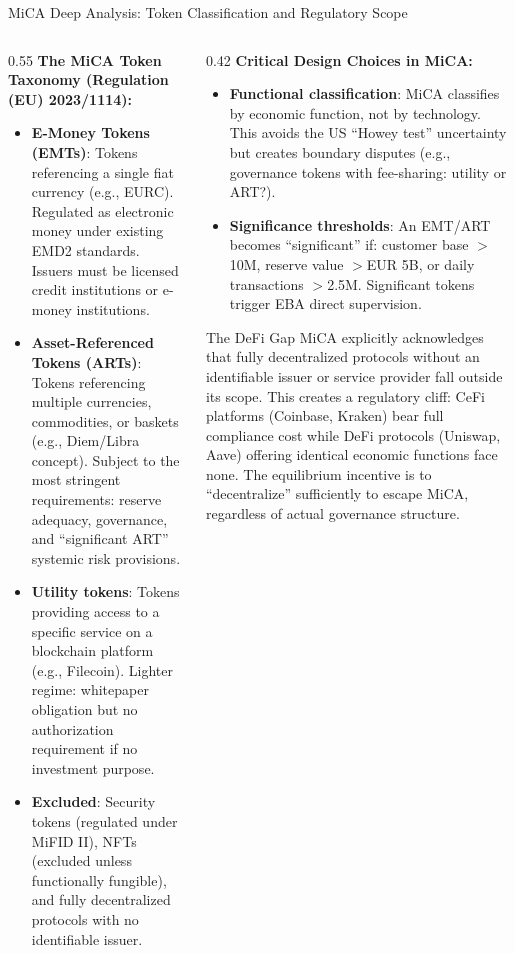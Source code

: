 \begin{frame}{MiCA Deep Analysis: Token Classification and Regulatory Scope}
  \begin{columns}[T]
    \begin{column}{0.55\textwidth}
      \textbf{The MiCA Token Taxonomy (Regulation (EU) 2023/1114):}
      \begin{itemize}
        \item \textbf{E-Money Tokens (EMTs)}: Tokens referencing a single fiat currency (e.g., EURC). Regulated as electronic money under existing EMD2 standards. Issuers must be licensed credit institutions or e-money institutions.
        \item \textbf{Asset-Referenced Tokens (ARTs)}: Tokens referencing multiple currencies, commodities, or baskets (e.g., Diem/Libra concept). Subject to the most stringent requirements: reserve adequacy, governance, and ``significant ART'' systemic risk provisions.
        \item \textbf{Utility tokens}: Tokens providing access to a specific service on a blockchain platform (e.g., Filecoin). Lighter regime: whitepaper obligation but no authorization requirement if no investment purpose.
        \item \textbf{Excluded}: Security tokens (regulated under MiFID II), NFTs (excluded unless functionally fungible), and fully decentralized protocols with no identifiable issuer.
      \end{itemize}
    \end{column}
    \begin{column}{0.42\textwidth}
      \textbf{Critical Design Choices in MiCA:}
      \begin{itemize}
        \item \textbf{Functional classification}: MiCA classifies by economic function, not by technology. This avoids the US ``Howey test'' uncertainty but creates boundary disputes (e.g., governance tokens with fee-sharing: utility or ART?).
        \item \textbf{Significance thresholds}: An EMT/ART becomes ``significant'' if: customer base $>$10M, reserve value $>$EUR 5B, or daily transactions $>$2.5M. Significant tokens trigger EBA direct supervision.
      \end{itemize}
      \vspace{0.2em}
      \begin{alertblock}{The DeFi Gap}
        MiCA explicitly acknowledges that fully decentralized protocols without an identifiable issuer or service provider fall outside its scope. This creates a regulatory cliff: CeFi platforms (Coinbase, Kraken) bear full compliance cost while DeFi protocols (Uniswap, Aave) offering identical economic functions face none. The equilibrium incentive is to ``decentralize'' sufficiently to escape MiCA, regardless of actual governance structure.

\end{alertblock}
\end{column}
\end{columns}
\end{frame}
